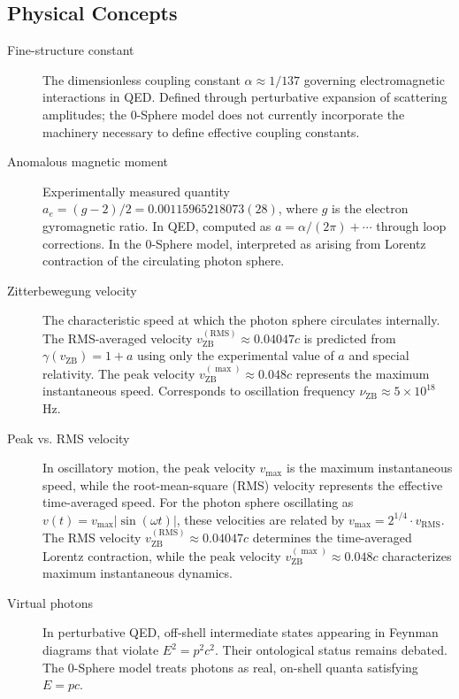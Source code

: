 \documentclass[12pt,letterpaper]{article}
\begin{document}
\subsection*{Physical Concepts}

\begin{description}
\item[Fine-structure constant] The dimensionless coupling constant $\alpha \approx 1/137$ governing electromagnetic interactions in QED. Defined through perturbative expansion of scattering amplitudes; the 0-Sphere model does not currently incorporate the machinery necessary to define effective coupling constants.

\item[Anomalous magnetic moment] Experimentally measured quantity $a_e = (g-2)/2 = 0.00115965218073(28)$, where $g$ is the electron gyromagnetic ratio. In QED, computed as $a = \alpha/(2\pi) + \cdots$ through loop corrections. In the 0-Sphere model, interpreted as arising from Lorentz contraction of the circulating photon sphere.

\item[Zitterbewegung velocity] The characteristic speed at which the photon sphere circulates internally. The RMS-averaged velocity $v_{\mathrm{ZB}}^{(\mathrm{RMS})} \approx 0.04047c$ is predicted from $\gamma(v_{\mathrm{ZB}}) = 1 + a$ using only the experimental value of $a$ and special relativity. The peak velocity $v_{\mathrm{ZB}}^{(\max)} \approx 0.048c$ represents the maximum instantaneous speed. Corresponds to oscillation frequency $\nu_{\mathrm{ZB}} \approx 5 \times 10^{18}$ Hz.

\item[Peak vs. RMS velocity] In oscillatory motion, the peak velocity $v_{\max}$ is the maximum instantaneous speed, while the root-mean-square (RMS) velocity represents the effective time-averaged speed. For the photon sphere oscillating as $v(t) = v_{\max}|\sin(\omega t)|$, these velocities are related by $v_{\max} = 2^{1/4} \cdot v_{\mathrm{RMS}}$. The RMS velocity $v_{\mathrm{ZB}}^{(\mathrm{RMS})} \approx 0.04047c$ determines the time-averaged Lorentz contraction, while the peak velocity $v_{\mathrm{ZB}}^{(\max)} \approx 0.048c$ characterizes maximum instantaneous dynamics.

\item[Virtual photons] In perturbative QED, off-shell intermediate states appearing in Feynman diagrams that violate $E^2 = p^2c^2$. Their ontological status remains debated. The 0-Sphere model treats photons as real, on-shell quanta satisfying $E = pc$.


\end{description}
\end{document}
